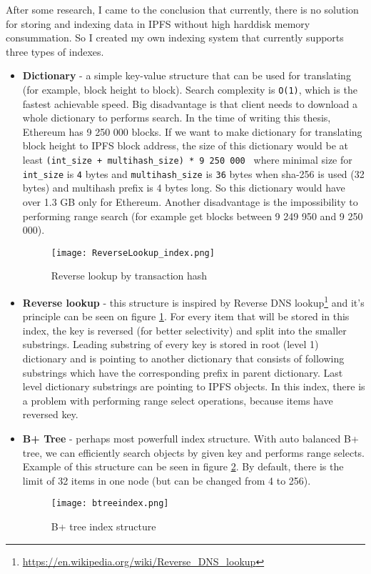 After some research, I came to the conclusion that currently, there is no solution for storing and indexing data in IPFS without high harddisk memory consummation. So I created my own indexing system that currently supports three types of indexes.

\begin{itemize}
    \item \textbf{Dictionary} - a simple key-value structure that can be used for translating (for example, block height to block). Search complexity is \texttt{O(1)}, which is the fastest achievable speed. Big disadvantage is that client needs to download a whole dictionary to performs search. In the time of writing this thesis, Ethereum has 9 250 000 blocks. If we want to make dictionary for translating block height to IPFS block address, the size of this dictionary would be at least \texttt{(int\_size + multihash\_size) * 9 250 000 } where minimal size for \texttt{int\_size} is \texttt{4} bytes and \texttt{multihash\_size} is \texttt{36} bytes when sha-256 is used (32 bytes) and multihash prefix is 4 bytes long. So this dictionary would have over 1.3 GB only for Ethereum. Another disadvantage is the impossibility to performing range search (for example get blocks between 9 249 950 and 9 250 000).

    \begin{figure}[h]
        \centering
        \texttt{[image: ReverseLookup\_index.png]}
        \caption{Reverse lookup by transaction hash}
        \label{reverseLookupIndex}
    \end{figure}


    \item \textbf{Reverse lookup} - this structure is inspired by Reverse DNS lookup\footnote{\url{https://en.wikipedia.org/wiki/Reverse_DNS_lookup}} and it's principle can be seen on figure \ref{reverseLookupIndex}. For every item that will be stored in this index, the key is reversed (for better selectivity) and split into the smaller substrings. Leading substring of every key is stored in root (level 1) dictionary and is pointing to another dictionary that consists of following substrings which have the corresponding prefix in parent dictionary. Last level dictionary substrings are pointing to IPFS objects. In this index, there is a problem with performing range select operations, because items have reversed key.
    \item \textbf{B+ Tree} - perhaps most powerfull index structure. With auto balanced B+ tree, we can efficiently search objects by given key and performs range selects. Example of this structure can be seen in figure \ref{btreeindex}. By default, there is the limit of 32 items in one node (but can be changed from 4 to 256). 
    


    \begin{figure}[h]
        \centering
        \texttt{[image: btreeindex.png]}
        \caption{B+ tree index structure}
        \label{btreeindex}
    \end{figure}

\end{itemize}

